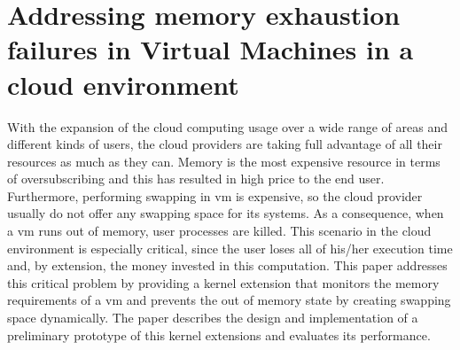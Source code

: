 \glsresetall

\section{Addressing memory exhaustion \hspace{0.01cm} failures in Virtual Machines in a cloud environment}\label{section_memory_exhaustion}

With the expansion of the cloud computing usage over a wide range of areas and different kinds
of users, the cloud providers are taking full advantage of all their resources as much as they can.
Memory is the most expensive resource in terms of oversubscribing and this has resulted in high
price to the end user. Furthermore, performing swapping in \gls{vm} is expensive, so the cloud
provider usually do not offer any swapping space for its systems. As a consequence, when a \gls{vm}
runs out of memory, user processes are killed. This scenario in the cloud environment is
especially critical, since the user loses all of his/her execution time and, by extension,
the money invested in this computation. This paper addresses this critical problem by providing
a kernel extension that monitors the memory requirements of a \gls{vm} and prevents the out
of memory state by creating swapping space dynamically. The paper describes the design and
implementation of a preliminary prototype of this kernel extensions and evaluates its
performance.

